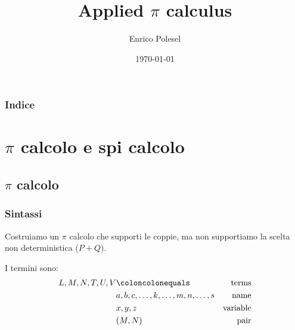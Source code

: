 \documentclass{beamer}
\theoremstyle{plain}
\theoremstyle{definition}
\theoremstyle{remark}
\begin{document}
\title{Applied $\pi$ calculus}
\date{\today}

\author{Enrico Polesel}



\begin{frame}[plain]
  \titlepage
\end{frame}

\begin{frame}[plain]
 \frametitle{Indice}
 \tableofcontents
\end{frame}




\AtBeginSubsection[]
{
  \begin{frame}[plain]{\secname $\rightarrow$ \subsecname}
    \tableofcontents[currentsubsection]
  \end{frame}
}

\section{$\pi$ calcolo e spi calcolo}

\subsection{$\pi$ calcolo}

\begin{frame}
  \frametitle{Sintassi}
  Costruiamo un $\pi$ calcolo che supporti le coppie, ma non
  supportiamo la scelta non deterministica ($P+Q$).

  I termini sono:
  \begin{align*}
    L,M,N,T,U,V & \coloncolonequals & \text{terms} \\
                & a,b,c,\dots,k,\dots,m,n,\dots,s & \text{name} \\
                & x,y,z & \text{variable} \\
                & (M,N) & \text{pair}
  \end{align*}
\end{frame}
\end{document}
